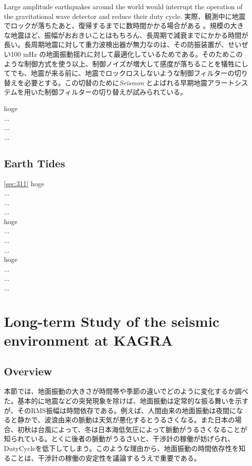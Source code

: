 Large amplitude earthquakes around the world would interrupt the operation of the gravitational wave detector and reduce their duty cycle. 実際、観測中に地震でロックが落ちたあと、復帰するまでに数時間かかる場合がある \cite{Coughlin2015real}。規模の大きな地震ほど、振幅がおおきいことはもちろん、長周期で減衰までにかかる時間が長い。長周期地震に対して重力波検出器が無力なのは、その防振装置が、せいぜい100 $\mathrm{mHz}$ の地面振動揺れに対して最適化しているためである\cite{}。そのためこのような制御方式を使う以上、制御ノイズが増大して感度が落ちることを犠牲にしてでも、地震が来る前に、地震でロックロスしないような制御フィルターの切り替えを必要とする。この切替のために\textit{Seismon} とよばれる早期地震アラートシステム\cite{Coughlin2017limiting}を用いた制御フィルターの切り替えが試みられている\cite{Biscans2018control}。

hoge\\
...\\
...\\
...\\


\subsection{Earth Tides} \label{sec:314}
\cref{sec:311}
hoge\\
...\\
...\\
...\\

hoge\\
...\\
...\\
...\\

hoge\\
...\\
...\\
...\\


\newpage
\section{Long-term Study of the seismic environment at KAGRA}
\subsection{Overview}
本節では、地面振動の大きさが時間帯や季節の違いでどのように変化するか調べた。基本的に地震などの突発現象を除けば、地面振動は定常的な振る舞いを示すが、そのRMS振幅は時間依存である。例えば、人間由来の地面振動は夜間になると静かで、波浪由来の脈動は天気が悪化するとうるさくなる。また日本の場合、初秋は台風によって、冬は日本海低気圧によって脈動がうるさくなることが知られている\cite{}。とくに後者の脈動がうるさいと、干渉計の稼働が妨げられ、DutyCycleを低下してしまう。このような理由から、地面振動の時間依存性を知ることは、干渉計の稼働の安定性を議論するうえで重要である。

